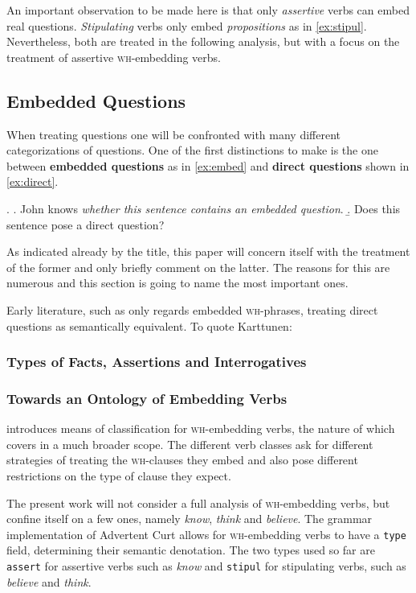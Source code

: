 \documentclass[11pt,a4paper]{article}
\newcommand{\term}[1]{\textsf{\textbf{#1}}} %
\newcommand{\code}{\texttt} %
\newcommand{\pn}{\textsf} %
\newcommand{\example}{\textit} %
\newcommand{\wh}{\textsc{wh}}
\newcommand{\acurt}{\pn{Advertent Curt}}
\theoremstyle{remark}
\theoremstyle{remark}
\theoremstyle{definition}
\begin{document}
An important observation to be made here is that only \emph{assertive} verbs can
embed real questions. \emph{Stipulating} verbs only embed \emph{propositions} as
in \ref{ex:stipul}.
Nevertheless, both are treated in the following analysis, but with a focus on
the treatment of assertive \wh-embedding verbs.


\subsection{Embedded Questions}

When treating questions one will be confronted with many different
categorizations of questions. One of the first distinctions to make is the one
between \term{embedded questions} as in \ref{ex:embed} and \term{direct
questions} shown in \ref{ex:direct}.

\ex. \a. John knows \emph{whether this sentence contains an embedded
question}.\label{ex:embed}
\b. Does this sentence pose a direct question?\label{ex:direct}

As indicated already by the title, this paper will concern itself with the
treatment of the former and only briefly comment on the latter. The reasons for
this are numerous  %
and this section is going to name the most important ones.

Early literature, such as \cite{karttunen:1977} only regards embedded
\wh-phrases, treating direct questions as semantically equivalent. To quote
Karttunen:



\subsubsection{Types of Facts, Assertions and Interrogatives}

\subsubsection{Towards an Ontology of Embedding Verbs}\label{sec:ontology}

\cite{karttunen:1977} introduces means of classification for \wh-embedding
verbs, the nature of which \cite{lahiri:diss} covers in a much broader scope.
The different verb classes ask for different strategies of treating the
\wh-clauses they embed and also pose different restrictions on the type of
clause they expect.

The present work will not consider a full analysis of \wh-embedding verbs, but
confine itself on a few ones, namely \example{know}, \example{think} and
\example{believe}. The grammar implementation of \acurt{} allows for \wh-embedding
verbs to have a \code{type} field, determining their semantic denotation. The two
types used so far are \code{assert} for assertive verbs such as \example{know}
and \code{stipul} for stipulating verbs, such as \example{believe} and
\example{think}.
\end{document}
